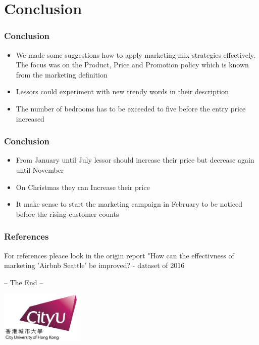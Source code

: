 \documentclass{beamer}
\begin{document}
\section{Conclusion}
\begin{frame}
\frametitle{Conclusion}
\begin{itemize}
\item We made some suggestions how to apply marketing-mix strategies effectively. The focus was on the Product, Price and Promotion policy which is known from the marketing definition
\item Lessors could experiment with new trendy words in their description
\item The number of bedrooms has to be exceeded to five before the entry price increased

\end{itemize}
\end{frame}
\begin{frame}
\frametitle{Conclusion}
\begin{itemize}
\item From January until July lessor should increase their price but decrease again until November
\item On Christmas they can Increase their price
\item It make sense to start the marketing campaign in February to be noticed before the rising customer counts
\end{itemize}
\end{frame}
\begin{frame}
\frametitle{References}
For references pleace look in the origin report "How can the effectivness of marketing 'Airbnb Seattle' be improved? - dataset of 2016 
\end{frame}
\begin{frame}
\Huge{\centerline{-- The End -- }} 
\vspace{5mm}
\begin{center}
	\includegraphics[width=4cm]{photo/0_cityu}
\end{center}
\end{frame}
\end{document}
